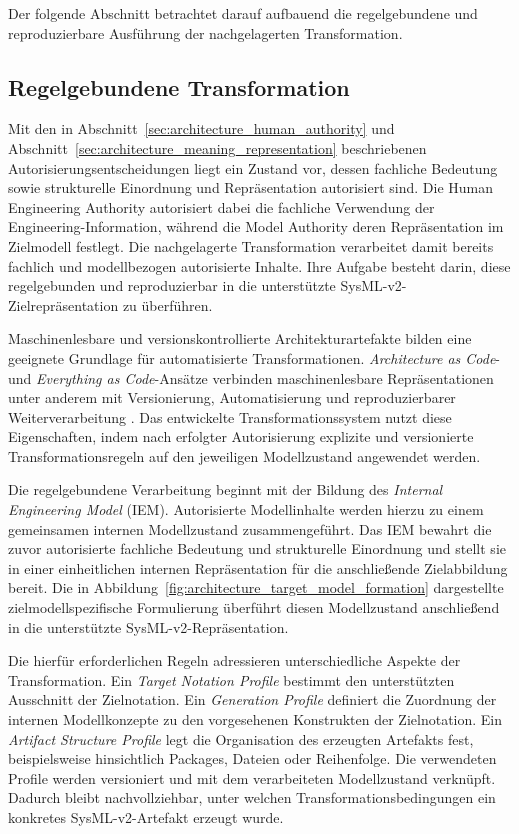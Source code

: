 Der folgende Abschnitt betrachtet darauf aufbauend die regelgebundene und
reproduzierbare Ausführung der nachgelagerten Transformation.

\subsection{Regelgebundene Transformation}
\label{sec:architecture_controlled_transformation}

Mit den in
Abschnitt~\ref{sec:architecture_human_authority} und
Abschnitt~\ref{sec:architecture_meaning_representation}
beschriebenen Autorisierungsentscheidungen liegt ein Zustand vor, dessen
fachliche Bedeutung sowie strukturelle Einordnung und Repräsentation
autorisiert sind. Die Human Engineering Authority autorisiert dabei die
fachliche Verwendung der Engineering-Information, während die Model
Authority deren Repräsentation im Zielmodell festlegt. Die nachgelagerte
Transformation verarbeitet damit bereits fachlich und modellbezogen
autorisierte Inhalte. Ihre Aufgabe besteht darin, diese regelgebunden und
reproduzierbar in die unterstützte SysML-v2-Zielrepräsentation zu
überführen.

Maschinenlesbare und versionskontrollierte Architekturartefakte bilden eine
geeignete Grundlage für automatisierte Transformationen.
\emph{Architecture as Code}- und \emph{Everything as Code}-Ansätze verbinden
maschinenlesbare Repräsentationen unter anderem mit Versionierung,
Automatisierung und reproduzierbarer Weiterverarbeitung
\cite{Bucaioni2025,Stirbu2022}. Das entwickelte Transformationssystem nutzt
diese Eigenschaften, indem nach erfolgter Autorisierung explizite und
versionierte Transformationsregeln auf den jeweiligen Modellzustand
angewendet werden.

Die regelgebundene Verarbeitung beginnt mit der Bildung des
\emph{Internal Engineering Model} (IEM). Autorisierte Modellinhalte werden
hierzu zu einem gemeinsamen internen Modellzustand zusammengeführt. Das IEM
bewahrt die zuvor autorisierte fachliche Bedeutung und strukturelle
Einordnung und stellt sie in einer einheitlichen internen Repräsentation für
die anschließende Zielabbildung bereit. Die in
Abbildung~\ref{fig:architecture_target_model_formation} dargestellte
zielmodellspezifische Formulierung überführt diesen Modellzustand
anschließend in die unterstützte SysML-v2-Repräsentation.

Die hierfür erforderlichen Regeln adressieren unterschiedliche Aspekte der
Transformation. Ein \emph{Target Notation Profile} bestimmt den unterstützten
Ausschnitt der Zielnotation. Ein \emph{Generation Profile} definiert die
Zuordnung der internen Modellkonzepte zu den vorgesehenen Konstrukten der
Zielnotation. Ein \emph{Artifact Structure Profile} legt die Organisation
des erzeugten Artefakts fest, beispielsweise hinsichtlich Packages, Dateien
oder Reihenfolge. Die verwendeten Profile werden versioniert und mit dem
verarbeiteten Modellzustand verknüpft. Dadurch bleibt nachvollziehbar, unter
welchen Transformationsbedingungen ein konkretes SysML-v2-Artefakt erzeugt
wurde.

